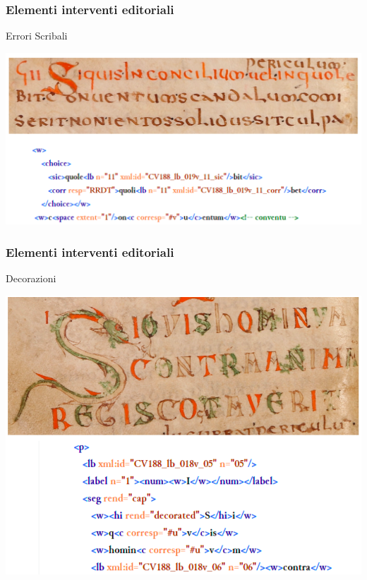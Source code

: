 \begin{frame}
    \frametitle{Elementi interventi editoriali}
    \addtocounter{nframe}{1}
    
   
    \begin{block}{Errori Scribali}
        \begin{center}
            \includegraphics[width=.9\textwidth]{imgs/Correzioni.png}
        \end{center}

    \end{block}
    
\end{frame}

\begin{frame}
    \frametitle{Elementi interventi editoriali}
    \addtocounter{nframe}{1}
    
   
    \begin{block}{Decorazioni}
        \begin{center}
            \includegraphics[width=.9\textwidth]{imgs/Decorazioni.png}
        \end{center}
    \end{block}
    
\end{frame}

